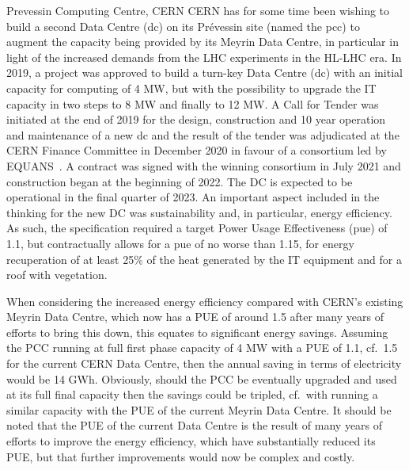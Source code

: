 \documentclass[../SustainableHEP.tex]{subfiles}
\begin{document}
\begin{bestpractice}{Prevessin Computing Centre, CERN}%
CERN has for some time been wishing to build a second Data Centre (\acrshort{dc}) on its Pr\'{e}vessin site (named the \acrshort{pcc}) to augment the capacity being provided by its Meyrin Data Centre, in particular in light of the increased demands from the LHC experiments in the HL-LHC era.
In 2019, a project was approved to build a turn-key Data Centre (\acrshort{dc}) with an initial capacity for computing of 4 MW, but with the possibility to upgrade the IT capacity in two steps to 8 MW and finally to 12 MW. 
A Call for Tender was initiated at the end of 2019 for the design, construction and 10 year operation and
maintenance of a new \acrshort{dc} and the result of the tender was
adjudicated at the CERN Finance Committee in December 2020 in favour of a consortium led by EQUANS~\cite{EQUANS}. A contract was signed with the winning
consortium in July 2021 and construction began at the beginning of 2022.
The DC is expected to be operational in the final quarter of 2023. An
important aspect included in the thinking for the new DC was
sustainability and, in particular, energy efficiency. As such, the
specification required a target Power Usage Effectiveness (\acrshort{pue}) of 1.1,
but contractually allows for a \acrshort{pue} of no worse than 1.15, for energy
recuperation of at least 25\% of the heat generated by the IT equipment
and for a roof with vegetation.

When considering the increased energy efficiency compared with CERN's
existing Meyrin Data Centre, which now has a PUE of around 1.5 after
many years of efforts to bring this down, this equates to significant
energy savings. Assuming the PCC running at full first phase capacity of
4 MW with a PUE of 1.1, cf.~1.5 for the current CERN Data Centre, then
the annual saving in terms of electricity would be 14 GWh. Obviously,
should the PCC be eventually upgraded and used at its full final
capacity then the savings could be tripled, cf.~with running a similar
capacity with the PUE of the current Meyrin Data Centre. It should be
noted that the PUE of the current Data Centre is the result of many
years of efforts to improve the energy efficiency, which have
substantially reduced its PUE, but that further improvements would now
be complex and costly.


\end{bestpractice}
\end{document}
